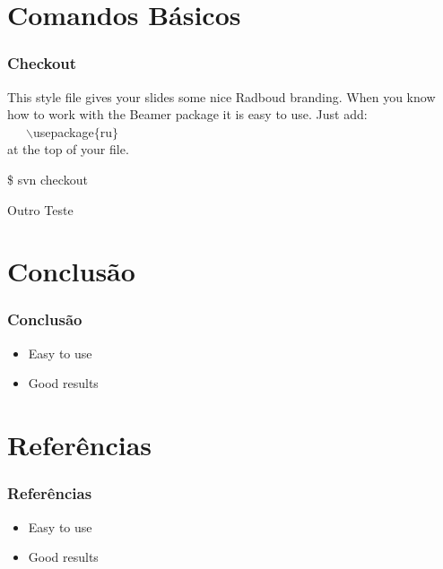 \documentclass{beamer}
\begin{document}
\section{Comandos B\'asicos}

\begin{frame}
    \frametitle{Checkout}

    This style file gives your slides some nice Radboud branding.
    When you know how to work with the Beamer package it is easy to use.
    Just add:\\ ~~~$\backslash$usepackage$\{$ru$\}$ \\ at the top of your file.


    \begin{bash}{}
        \$ svn checkout
    \end{bash}

    \begin{block}{Outro}
        Teste
    \end{block}
\end{frame}

\section{Conclus\~ao}

\begin{frame}
    \frametitle{Conclus\~ao}

    \begin{itemize}
        \item Easy to use
        \item Good results
    \end{itemize}
\end{frame}

\section{Refer\^encias}
\begin{frame}
    \frametitle{Refer\^encias}

    \begin{itemize}
        \item Easy to use
        \item Good results
    \end{itemize}
\end{frame}
\end{document}
